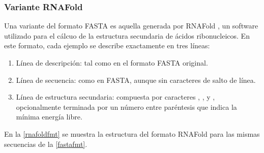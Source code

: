 \subsubsection{Variante RNAFold}
Una variante del formato FASTA es aquella generada por RNAFold
\cite{vienna}, un software utilizado para el cálcuo de la estructura
secundaria de ácidos ribonucleicos.  En este formato, cada
ejemplo se describe exactamente en tres líneas:

\begin{enumerate}
\item Línea de descripción: tal como en el formato FASTA original.
\item Línea de secuencia: como en FASTA, aunque sin caracteres de
  salto de línea.
\item Línea de estructura secundaria: compuesta por caracteres
  \mono{(}, \mono{)}, y , opcionalmente terminada por un
  número entre paréntesis que indica la mínima energía libre.
\end{enumerate}
En la \autoref{rnafoldfmt} se muestra la estructura del formato
RNAFold para las mismas secuencias de la \autoref{fastafmt}.